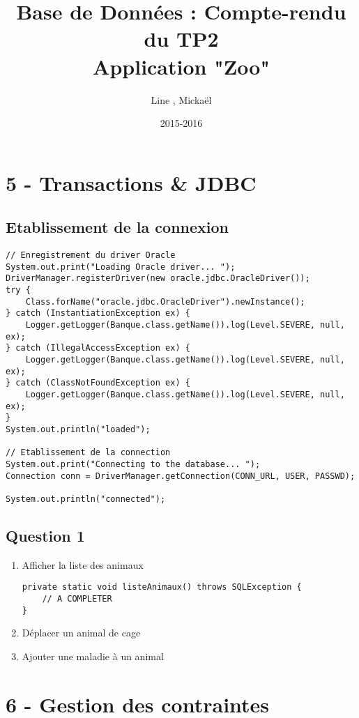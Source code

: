 \documentclass{article}
\title{Base de Données : Compte-rendu du TP2\\Application "Zoo"}
\author{Line \bsc{POUVARET}, Mickaël \bsc{TURNEL}}
\date{2015-2016}
\begin{document}
\maketitle

\section*{5 -	Transactions \& JDBC}
\subsection*{Etablissement de la connexion}
	\begin{lstlisting}
// Enregistrement du driver Oracle
System.out.print("Loading Oracle driver... "); 
DriverManager.registerDriver(new oracle.jdbc.OracleDriver());
try {
	Class.forName("oracle.jdbc.OracleDriver").newInstance();
} catch (InstantiationException ex) {
	Logger.getLogger(Banque.class.getName()).log(Level.SEVERE, null, ex);
} catch (IllegalAccessException ex) {
	Logger.getLogger(Banque.class.getName()).log(Level.SEVERE, null, ex);
} catch (ClassNotFoundException ex) {
	Logger.getLogger(Banque.class.getName()).log(Level.SEVERE, null, ex);
}
System.out.println("loaded");
  	    
// Etablissement de la connection
System.out.print("Connecting to the database... "); 
Connection conn = DriverManager.getConnection(CONN_URL, USER, PASSWD);
            
System.out.println("connected");
	\end{lstlisting}

\subsection*{Question 1}
\begin{enumerate}[label=\arabic*)]
	\item Afficher la liste des animaux
	\begin{lstlisting}
private static void listeAnimaux() throws SQLException {
	// A COMPLETER
}
	\end{lstlisting}

	\item Déplacer un animal de cage
	\item Ajouter une maladie à un animal
\end{enumerate}

\section*{6 - Gestion des contraintes}
\end{document}
